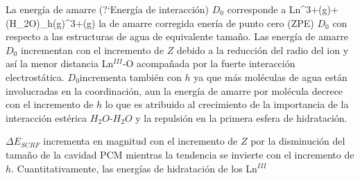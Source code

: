 La energ\'ia de amarre (?`Energ\'ia de interacci\'on) $D_0$ 
corresponde a
\be
Ln^{3+}(g)+(H_2O)_h(g)\rightarrow [Ln(H_2O)_h]^{3+}(g)
\ee
la de amarre corregida ener\'ia de punto cero (ZPE) $D_0$ con 
respecto a las estructuras de agua de equivalente tama\~no. Las
energ\'ia de amarre $D_0$ incrementan con el incremento de $Z$ debido
a la reducci\'on del radio del ion y as\'i la menor distancia 
Ln$^{III}$-O acompa\~nada por la fuerte interacci\'on 
electrost\'atica. $D_0$incrementa tambi\'en con $h$ ya que m\'as 
mol\'eculas de agua est\'an involucradas en la coordinaci\'on, aun la
energ\'ia de amarre por mol\'ecula decrece con el incremento de $h$ 
lo que es atribuido al crecimiento de la importancia de la 
interacci\'on est\'erica $H_2O$-$H_2O$ y la repulsi\'on en la 
primera esfera de hidrataci\'on. 

$\Delta E_{SCRF}$ incrementa en magnitud con el incremento de $Z$ 
por la disminuci\'on del tama\~no de la cavidad PCM mientras la 
tendencia se invierte con el incremento de $h$. Cuantitativamente, 
las energ\'ias de hidrataci\'on de los Ln$^{III}$
